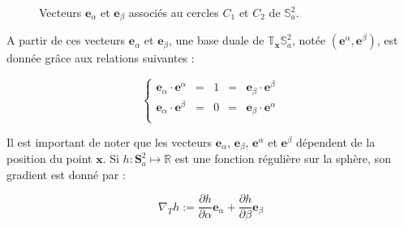 \begin{figure}[ht]
\begin{center}
\end{center}
\caption{Vecteurs $\mathbf{e}_{\alpha}$ et $\mathbf{e}_{\beta}$ associés au cercles $C_1$ et $C_2$ de $\mathbb{S}_a^2$.}
\label{fig: e_alpha et e_beta}
\end{figure}

A partir de ces vecteurs $\mathbf{e}_{\alpha}$ et $\mathbf{e}_{\beta}$, une base duale de $\mathbb{T}_{\mathbf{x}}\mathbb{S}_a^2$, notée $\left( \mathbf{e}^{\alpha}, \mathbf{e}^{\beta} \right)$, est donnée grâce aux relations suivantes :

\begin{equation}
\left\lbrace
\begin{array}{rcccl}
\mathbf{e}_{\alpha} \cdot \mathbf{e}^{\alpha} & = & 1 & = & \mathbf{e}_{\beta} \cdot \mathbf{e}^{\beta} \\
\mathbf{e}_{\alpha} \cdot \mathbf{e}^{\beta} & = & 0 & = & \mathbf{e}_{\beta} \cdot \mathbf{e}^{\alpha} \\
\end{array}
\right.
\label{eq: dualite alpha beta}
\end{equation}

Il est important de noter que les vecteurs $\mathbf{e}_{\alpha}$, $\mathbf{e}_{\beta}$, $\mathbf{e}^{\alpha}$ et $\mathbf{e}^{\beta}$ dépendent de la position du point $\mathbf{x}$. 
Si $h : \mathbf{S}_a^2 \mapsto \mathbb{R}$ est une fonction régulière sur la sphère, son gradient est donné par :

\begin{equation}
\nabla_{T} h := \dfrac{\partial h}{\partial \alpha} \mathbf{e}_{\alpha} + \dfrac{\partial h}{\partial \beta} \mathbf{e}_{\beta}
\label{eq: gradient}
\end{equation}

